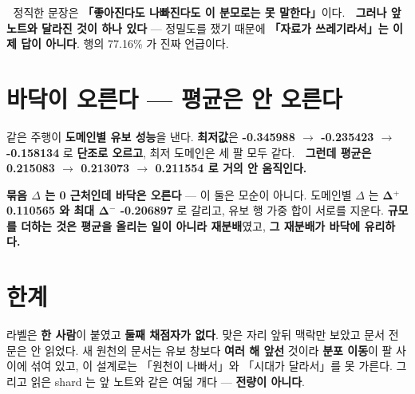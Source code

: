 \documentclass[10pt]{article}
\begin{document}
🔴 정직한 문장은 \textbf{「좋아진다도 나빠진다도 이 분모로는 못 말한다」}이다.
🔴 \textbf{그러나 앞 노트와 달라진 것이 하나 있다} --- 정밀도를 쟀기 때문에
\textbf{「자료가 쓰레기라서」는 이제 답이 아니다}. 행의 77.16\% 가 진짜 언급이다.


\section{바닥이 오른다 --- 평균은 안 오른다}

같은 주행이 \textbf{도메인별 유보 성능}을 낸다. \textbf{최저값}은
\textbf{-0.345988 $\to$ -0.235423 $\to$ -0.158134} 로 \textbf{단조로 오르고}, 최저 도메인은 세 팔 모두
같다. 🔴 \textbf{그런데 평균은 0.215083 $\to$ 0.213073 $\to$ 0.211554 로 거의 안 움직인다.}

\textbf{묶음 $\Delta$ 는 0 근처인데 바닥은 오른다} --- 이 둘은 모순이 아니다. 도메인별 $\Delta$ 는
\textbf{Δ$^+$ 0.110565 와 최대 Δ$^-$ -0.206897} 로 갈리고, 유보 행 가중 합이 서로를 지운다.
\textbf{규모를 더하는 것은 평균을 올리는 일이 아니라 재분배}였고, \textbf{그 재분배가 바닥에 유리하다.}


\section{한계}

라벨은 \textbf{한 사람}이 붙였고 \textbf{둘째 채점자가 없다}. 맞은 자리 앞뒤 맥락만 보았고 문서 전문은
안 읽었다. 새 원천의 문서는 유보 창보다 \textbf{여러 해 앞선} 것이라 \textbf{분포 이동}이 팔 사이에
섞여 있고, 이 설계로는 「원천이 나빠서」와 「시대가 달라서」를 못 가른다. 그리고 읽은 shard 는 앞
노트와 같은 여덟 개다 --- \textbf{전량이 아니다}.
\end{document}
